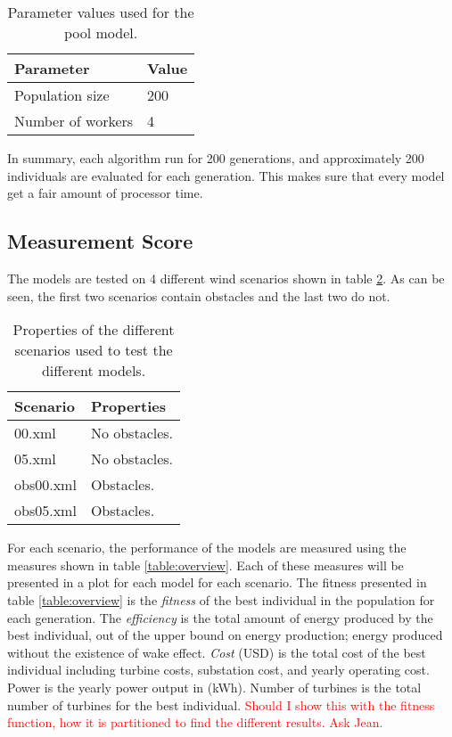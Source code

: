 \begin{table}[h!]
\centering
\caption{Parameter values used for the pool model.}
\label{table:final parameter settings pool model}
\begin{tabular}{l|l}
\textbf{Parameter} & \textbf{Value} \\ 
\hline 
Population size & 200 \\  
Number of workers & 4 \\ 
\end{tabular}
\end{table}


\noindent In summary, each algorithm run for 200 generations, and approximately 200 individuals are evaluated for each generation. This makes sure that every model get a fair amount of processor time.\\


\subsection{Measurement Score}


The models are tested on 4 different wind scenarios shown in table \ref{table:scenario properties}. As can be seen, the first two scenarios contain obstacles and the last two do not. \\


\begin{table}[h!]
\centering
\caption{Properties of the different scenarios used to test the different models.}
\label{table:scenario properties}
\begin{tabular}{l|l}
\textbf{Scenario} & \textbf{Properties} \\
\hline
00.xml            & No obstacles. \\
05.xml            & No obstacles. \\
obs00.xml         & Obstacles. \\
obs05.xml         & Obstacles. \\
\end{tabular}
\end{table}


\noindent For each scenario, the performance of the models are measured using the measures shown in table \ref{table:overview}. Each of these measures will be presented in a plot for each model for each scenario. The fitness presented in table \ref{table:overview} is the \textit{fitness} of the best individual in the population for each generation. The \textit{efficiency} is the total amount of energy produced by the best individual, out of the upper bound on energy production; energy produced without the existence of wake effect. \textit{Cost} (USD) is the total cost of the best individual including turbine costs, substation cost, and yearly operating cost. Power is the yearly power output in (kWh). Number of turbines is the total number of turbines for the best individual. \textcolor{red}{Should I show this with the fitness function, how it is partitioned to find the different results. Ask Jean.}\\


